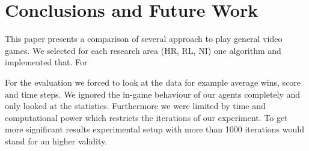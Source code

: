 \section{Conclusions and Future Work} 
\label{sec:conc}

This paper presents a comparison of several approach to play general video games. We selected for each research area (\ac{HR}, \ac{RL}, \ac{NI})
one algorithm and implemented that. For


For the evaluation we forced to look at the data for example average wins, score and time steps.
We ignored the in-game behaviour of our agents completely and only looked at the statistics. 
Furthermore we were limited by time and computational power which restricts the iterations of our experiment. 
To get more significant results experimental setup with more than 1000 iterations would stand for an higher validity.




